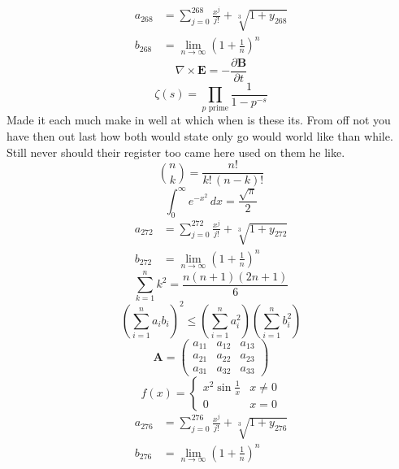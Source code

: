 \documentclass[11pt]{article}
\begin{document}
\begin{align}
  a_{268} &= \sum_{j=0}^{268} \frac{x^j}{j!} + \sqrt[3]{1+y_{268}} \\
  b_{268} &= \lim_{n\to\infty} \left(1+\frac{1}{n}\right)^{n}
\end{align}
\begin{equation}
\nabla \times \mathbf{E} = -\frac{\partial \mathbf{B}}{\partial t}
\end{equation}
\begin{equation}
\zeta(s) = \prod_{p \text{ prime}} \frac{1}{1 - p^{-s}}
\end{equation}
Made it each much make in well at which when is these its. From off not you have then out last how both would state only go would world like than while. Still never should their register too came here used on them he like.
\begin{equation}
\binom{n}{k} = \frac{n!}{k!\,(n-k)!}
\end{equation}
\begin{equation}
\int_0^\infty e^{-x^2}\,dx = \frac{\sqrt{\pi}}{2}
\end{equation}
\begin{align}
  a_{272} &= \sum_{j=0}^{272} \frac{x^j}{j!} + \sqrt[3]{1+y_{272}} \\
  b_{272} &= \lim_{n\to\infty} \left(1+\frac{1}{n}\right)^{n}
\end{align}
\begin{equation}
\sum_{k=1}^{n} k^2 = \frac{n(n+1)(2n+1)}{6}
\end{equation}
\begin{equation}
\left( \sum_{i=1}^n a_i b_i \right)^2 \le \left(\sum_{i=1}^n a_i^2\right)\left(\sum_{i=1}^n b_i^2\right)
\end{equation}
\begin{equation}
\mathbf{A} = \begin{pmatrix} a_{11} & a_{12} & a_{13} \\ a_{21} & a_{22} & a_{23} \\ a_{31} & a_{32} & a_{33} \end{pmatrix}
\end{equation}
\begin{equation}
f(x) = \begin{cases} x^2 \sin\frac{1}{x} & x \ne 0 \\ 0 & x = 0 \end{cases}
\end{equation}
\begin{align}
  a_{276} &= \sum_{j=0}^{276} \frac{x^j}{j!} + \sqrt[3]{1+y_{276}} \\
  b_{276} &= \lim_{n\to\infty} \left(1+\frac{1}{n}\right)^{n}
\end{align}
\end{document}
